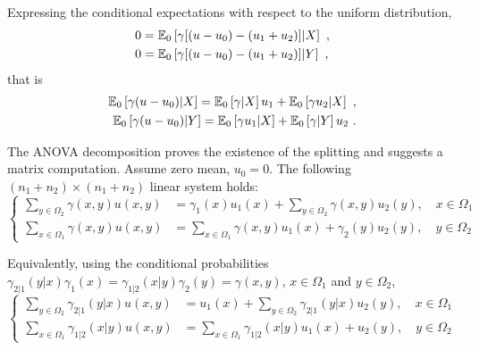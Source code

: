 \documentclass[runningheads]{llncs}
\begin{document}
Expressing the conditional expectations with respect to the uniform distribution,
%
  \begin{align*}
    0 &= {\operatorname{\mathbb E}}_{0}\left[\gamma[(u-u_0) - (u_1+u_2)] \middle| X\right] \ , \\
   0 &= {\operatorname{\mathbb E}}_{0}\left[\gamma[(u-u_0) - (u_1+u_2)] \middle| Y\right] \ ,
  \end{align*}
that is
%
  \begin{align*}
  {\operatorname{\mathbb E}}_{0}\left[\gamma(u-u_0) \middle| X\right] =  {\operatorname{\mathbb E}}_{0}\left[\gamma \middle| X\right] u_1 + {\operatorname{\mathbb E}}_{0}\left[\gamma u_2 \middle| X\right] \ , \\
    {\operatorname{\mathbb E}}_{0}\left[\gamma(u-u_0) \middle| Y\right] =  {\operatorname{\mathbb E}}_{0}\left[\gamma u_1 \middle| X\right]  + {\operatorname{\mathbb E}}_{0}\left[\gamma \middle| Y\right] u_2\ .
  \end{align*}

The ANOVA decomposition proves the existence of the splitting and suggests a matrix computation. Assume zero mean, $u_0=0$. The following $(n_1+n_2)\times(n_1+n_2)$ linear system holds:
%
\begin{equation*}
\begin{cases}
  \sum_{y \in \Omega_2} \gamma(x,y)u(x,y) &= \gamma_1(x) u_1(x) + \sum_{y \in \Omega_2} \gamma(x,y) u_2(y) , \quad x \in \Omega_1 \\
  \sum_{x \in \Omega_1} \gamma(x,y)u(x,y) &= \sum_{x \in \Omega_1} \gamma(x,y) u_1(x)  + \gamma_2(y)u_2(y) , \quad y \in \Omega_2
\end{cases}
\end{equation*}
%

Equivalently, using the conditional probabilities $\gamma_{2|1}(y|x) \gamma_1(x) = \gamma_{1|2}(x|y) \gamma_2(y) = \gamma(x,y)$, $x \in \Omega_1$ and $y \in \Omega_2$,
%
\begin{equation*}
\begin{cases}
  \sum_{y \in \Omega_2} \gamma_{2|1}(y|x)u(x,y) &= u_1(x) + \sum_{y \in \Omega_2} \gamma_{2|1}(y|x) u_2(y) , \quad x \in \Omega_1 \\
  \sum_{x \in \Omega_1} \gamma_{1|2}(x|y)u(x,y) &= \sum_{x \in \Omega_1} \gamma_{1|2}(x|y) u_1(x)  + u_2(y) , \quad y \in \Omega_2
\end{cases}
\end{equation*}
%
\end{document}
